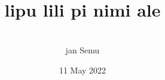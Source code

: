 \documentclass[statementpaper,oneside,article,14pt]{memoir}
\newcommand{\BackgroundPic}[1]{%
\put(0,0){%
\parbox[b][\paperheight]{\paperwidth}{%
\vfill
\centering
{\transparent{0.4} \texttt{[image: \#1]}}%
\vfill
}}}
\begin{document}
\newcommand{\nimi}[3]{\item[{\sitpon#1} #2] #3}


\title{{} \\ lipu lili pi nimi ale}
\author{{\sitpon󱤑󱦐󱥚󱤉󱤻󱥱󱦑} \\ jan Semu}
\date{11 May 2022}

\begingroup
\let\cleardoublepage\clearpage


\begin{titlingpage}
\maketitle


\end{titlingpage}

\endgroup

\pagestyle{empty}


\end{document}
